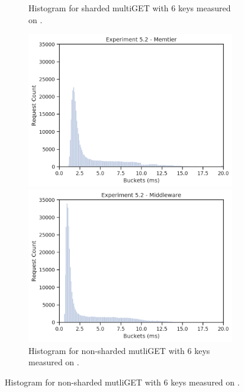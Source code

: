 \begin{figure}
\begin{subfigure}[t!]{0.48\textwidth}
                \caption{Histogram for sharded multiGET with 6 keys measured on \mw.\label{fig:histogram_sharded_mw}}
            \end{subfigure}
            \begin{subfigure}[t!]{0.48\textwidth}
                \centering
                \includegraphics[width=\textwidth]{../data_analysis/figures/5-2_mt_histogram.png}
                \caption{Histogram for non-sharded mutliGET with 6 keys measured on
                \cli.\label{fig:histogram_nonsharded_mt}}
                \includegraphics[width=\textwidth]{../data_analysis/figures/5-2_mw_histogram.png}
                \caption{Histogram for non-sharded mutliGET with 6 keys measured on
                \mw.\label{fig:histogram_nonsharded_nw}}

\end{subfigure}
\end{figure}
